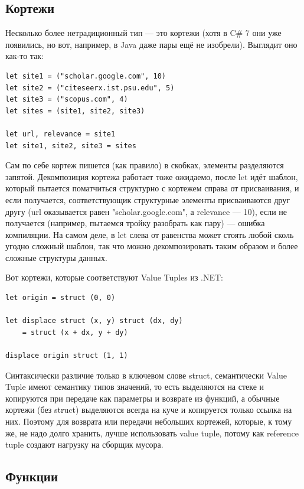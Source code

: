 \documentclass[a5paper]{article}
\begin{document}
\subsection{Кортежи}

Несколько более нетрадиционный тип --- это кортежи (хотя в C\# 7 они уже появились, но вот, например, в Java даже пары ещё не изобрели). Выглядит оно как-то так:

\begin{verbatim}
let site1 = ("scholar.google.com", 10)
let site2 = ("citeseerx.ist.psu.edu", 5)
let site3 = ("scopus.com", 4)
let sites = (site1, site2, site3)

let url, relevance = site1
let site1, site2, site3 = sites
\end{verbatim}

Сам по себе кортеж пишется (как правило) в скобках, элементы разделяются запятой. Декомпозиция кортежа работает тоже ожидаемо, после let идёт шаблон, который пытается поматчиться структурно с кортежем справа от присваивания, и если получается, соответствующик структурные элементы присваиваются друг другу (url оказывается равен "scholar.google.com", а relevance --- 10), если не получается (например, пытаемся тройку разобрать как пару) --- ошибка компиляции. На самом деле, в let слева от равенства может стоять любой сколь угодно сложный шаблон, так что можно декомпозировать таким образом и более сложные структуры данных.

Вот кортежи, которые соответствуют Value Tuples из .NET:

\begin{verbatim}
let origin = struct (0, 0)

let displace struct (x, y) struct (dx, dy)
    = struct (x + dx, y + dy)

displace origin struct (1, 1)
\end{verbatim}

Синтаксически различие только в ключевом слове struct, семантически Value Tuple имеют семантику типов значений, то есть выделяются на стеке и копируются при передаче как параметры и возврате из функций, а обычные кортежи (без struct) выделяются всегда на куче и копируется только ссылка на них. Поэтому для возврата или передачи небольших кортежей, которые, к тому же, не надо долго хранить, лучше использовать value tuple, потому как reference tuple создают нагрузку на сборщик мусора.

\subsection{Функции}
\end{document}
